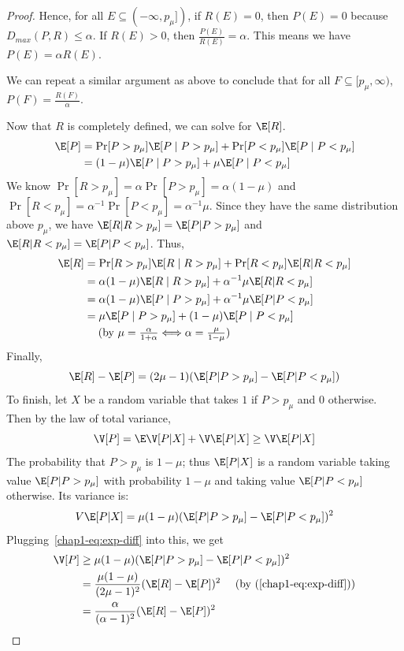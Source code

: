 \begin{proof}
Hence, for all $E \subseteq (-\infty, p_\mu])$, if $R(E) = 0$, then $P(E) = 0$ because $D_{max}(P,R) \leq \alpha$. If $R(E) > 0$, then $\frac{P(E)}{R(E)} = \alpha$. This means
we have $P(E) = \alpha R(E)$. 

We can repeat a similar argument as above to conclude that for all $F \subseteq [p_\mu, \infty)$, $P(F) = \frac{R(F)}{\alpha}$.

Now that $R$ is completely defined, we can solve for $\E[R]$.
\begin{align*}
    \E[P] &= \Pr[P > p_\mu] \E[P \mid P > p_\mu] + \Pr[P < p_\mu] \E[P \mid P < p_\mu] \\
    &= (1-\mu) \E[P \mid P > p_\mu] + \mu \E[P \mid P < p_\mu]
\end{align*}
We know $\Pr[R > p_\mu] = \alpha \Pr[P > p_\mu] = \alpha(1-\mu)$ and $\Pr[R <
p_\mu] = \alpha^{-1} \Pr[P < p_\mu] = \alpha^{-1}\mu$. Since they have the same
distribution above $p_\mu$, we have $\E[R | R > p_\mu] = \E[P | P > p_\mu]$ and
$\E[R | R < p_\mu] = \E[P | P < p_\mu]$. Thus,
\begin{align*}
    \E[R] &= \Pr[R > p_\mu] \E[R \mid R > p_\mu] + \Pr[R < p_\mu] \E[R | R < p_\mu]\\
    &= \alpha(1-\mu) \E[R \mid R > p_\mu] + \alpha^{-1} \mu \E[R | R < p_\mu] \\
    &= \alpha(1-\mu) \E[P \mid P > p_\mu] + \alpha^{-1} \mu \E[P | P < p_\mu] \\
    &= \mu \E[P \mid P > p_\mu] + (1-\mu) \E[P \mid P < p_\mu] \\
    &\hspace{4.5mm} \text{(by $\textstyle{\mu=\frac{\alpha}{1+\alpha} \Longleftrightarrow \alpha = \frac{\mu}{1-\mu}}$)}
\end{align*}
Finally,
\begin{equation}\label{chap1-eq:exp-diff}
    \E[R] - \E[P] = (2\mu - 1)(\E[P | P > p_\mu] - \E[P | P < p_\mu])
\end{equation}
To finish, 
let $X$ be a random variable that takes $1$ if $P > p_\mu$ and $0$ otherwise. Then 
by the law of total variance,
\[
\V[P] = \E\V[P | X] + \V\E[P | X] \geq \V \E[P | X]
\]
The probability that $P > p_\mu$ is $1-\mu$; thus 
$\E[P | X]$
is a random variable taking value $\E[P | P > p_\mu]$ with probability $1-\mu$
and taking value $\E[P | P < p_\mu]$ otherwise. Its variance is:
\[
V \E[P | X]
= \mu (1-\mu)(\E[P|P > p_\mu] - \E[P|P < p_\mu])^2
\]
Plugging~\eqref{chap1-eq:exp-diff} into this, we get
\begin{align*}
\V[P] &\geq\mu (1-\mu)(\E[P|P > p_\mu] - \E[P|P < p_\mu])^2 \\
&= \frac{\mu(1-\mu)}{(2\mu-1)^2}(\E[R] - \E[P])^2 ~~~~ \text{(by (\ref{chap1-eq:exp-diff}))}\\
&= \frac{\alpha}{(\alpha-1)^2}(\E[R] - \E[P])^2
\end{align*}
\end{proof}

